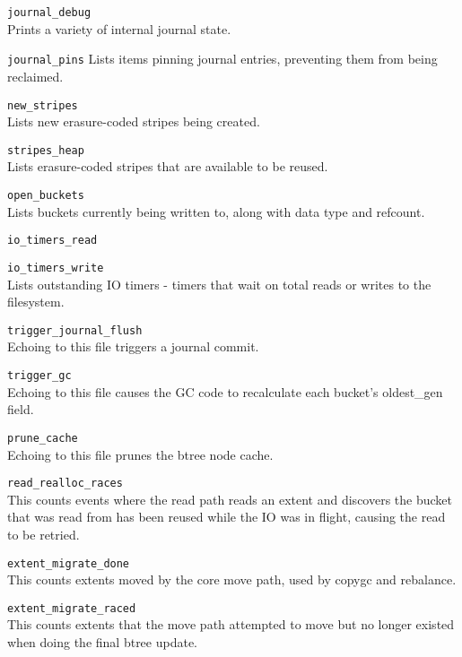 \documentclass{article}
\begin{document}
\begin{description}
	\item \texttt{journal\_debug} \\
		Prints a variety of internal journal state.

	\item \texttt{journal\_pins}
		Lists items pinning journal entries, preventing them from being
		reclaimed.

	\item \texttt{new\_stripes} \\
		Lists new erasure-coded stripes being created.

	\item \texttt{stripes\_heap} \\
		Lists erasure-coded stripes that are available to be reused.

	\item \texttt{open\_buckets} \\
		Lists buckets currently being written to, along with data type
		and refcount.

	\item \texttt{io\_timers\_read} \\
	\item \texttt{io\_timers\_write} \\
		Lists outstanding IO timers - timers that wait on total reads or
		writes to the filesystem.

	\item \texttt{trigger\_journal\_flush} \\
		Echoing to this file triggers a journal commit.

	\item \texttt{trigger\_gc} \\
		Echoing to this file causes the GC code to recalculate each
		bucket's oldest\_gen field.

	\item \texttt{prune\_cache} \\
		Echoing to this file prunes the btree node cache.

	\item \texttt{read\_realloc\_races} \\
		This counts events where the read path reads an extent and
		discovers the bucket that was read from has been reused while
		the IO was in flight, causing the read to be retried.

	\item \texttt{extent\_migrate\_done} \\
		This counts extents moved by the core move path, used by copygc
		and rebalance.

	\item \texttt{extent\_migrate\_raced} \\
		This counts extents that the move path attempted to move but no
		longer existed when doing the final btree update.
\end{description}
\end{document}
